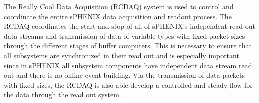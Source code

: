 The Really Cool Data Acquisition (RCDAQ) system is used to control and coordinate the entire sPHENIX data acquisition and readout process. 
The RCDAQ coordinates the start and stop of all of sPHENIX's independent read out data streams and transmission of data of variable types with fixed packet sizes through the different stages of buffer computers.
This is necessary to ensure that all subsystems are synchronized in their read out and is especially important since in sPHENIX all subsystem components have independent data stream read out and there is no online event building.
Via the transmission of data packets with fixed sizes, the RCDAQ is also able develop a controlled and steady flow for the data through the read out system.